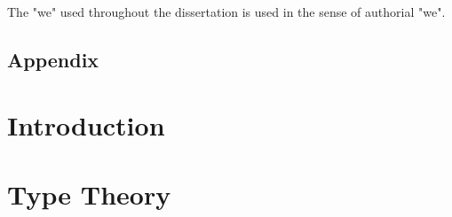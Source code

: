 \documentclass{l4proj}
\begin{document}
The "we" used throughout the dissertation is used in the sense of
authorial "we". 


\tableofcontents

\begin{toappendix}
  \chapter{Appendix}
\end{toappendix}


%
%
%
%
%
%
%
\chapter{Introduction}



\chapter{Type Theory}

\end{document}
